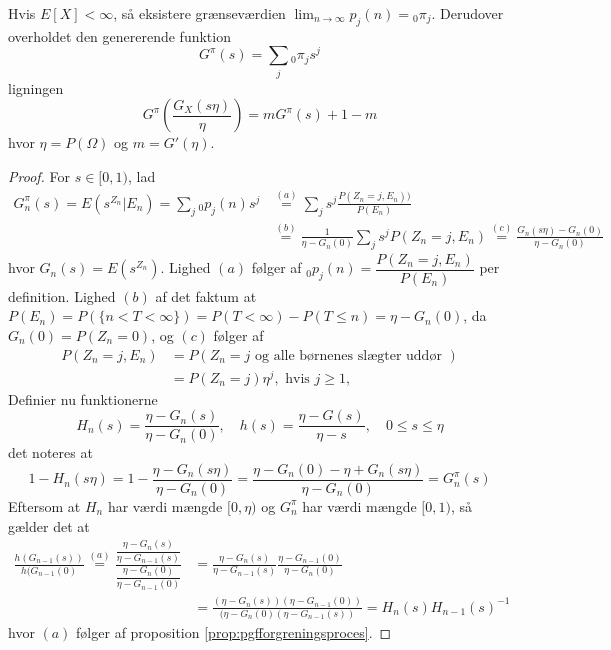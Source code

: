 \begin{lem}
Hvis $E[X] < \infty$, så eksistere grænseværdien $\lim_{n \to \infty} p_j (n) = {}_0\pi_j$. Derudover overholdet den genererende funktion
\begin{equation*}
    G^\pi(s) = \sum_j {}_0 \pi_j s^j
\end{equation*}
ligningen 
\begin{equation*}
    G^\pi\left(\frac{G_X(s\eta)}{\eta}\right) = m G^\pi(s) + 1 - m
\end{equation*}
hvor $\eta = P(\Omega)$ og $m = G'(\eta)$.
\end{lem}
\begin{proof}
For $s \in [0, 1)$, lad
\begin{align*}
    G_n^\pi (s) = E(s^{Z_n} | E_n) = \sum_j {}_0p_j(n)s^j &\stackrel{(a)}= \sum_j s^j \frac{P(Z_n = j, E_n))}{P(E_n)} \\ 
    &\stackrel{(b)} = \frac{1}{\eta - G_n(0)} \sum_j s^j P(Z_n = j, E_n) \stackrel{(c)} = \frac{G_n(s\eta) - G_n(0)}{\eta - G_n(0)}
\end{align*}
hvor $G_n(s) = E(s^{Z_n})$. Lighed $(a)$ følger af ${}_0p_j(n) = \dfrac{P(Z_n = j, E_n)}{P(E_n)}$ per definition. Lighed $(b)$ af det faktum at $P(E_n) = P(\{n < T < \infty\}) = P(T < \infty) - P(T \leq n) = \eta - G_n(0)$, da $G_n(0) = P(Z_n = 0)$, og $(c)$ følger af
\begin{align*}
    P(Z_n = j, E_n) &= P(Z_n = j \text{ og alle børnenes slægter uddør }) \\
    &= P(Z_n = j) \eta^j, \text{ hvis } j \geq 1,
\end{align*}
Definier nu funktionerne 
\begin{equation*}
    H_n(s) = \frac{\eta - G_n(s)}{\eta - G_n(0)}, \quad h(s) = \frac{\eta - G(s)}{\eta - s}, \quad 0 \leq s \leq \eta
\end{equation*}
det noteres at 
\begin{equation*} \label{eq:lemmaErAids}
    1 - H_n(s \eta) = 1 - \frac{\eta - G_n(s\eta)}{\eta - G_n(0)} = \frac{\eta - G_n(0) - \eta + G_n(s\eta)}{\eta - G_n(0)} = G_n^\pi(s)
\end{equation*}
Eftersom at $H_n$ har værdi mængde $[0, \eta)$ og $G_n^\pi$ har værdi mængde $[0, 1)$, så gælder det at 
\begin{align*}
    \frac{h(G_{n - 1}(s))}{h(G_{n - 1}(0)} \stackrel{(a)}=
    \frac{\dfrac{\eta - G_{n}(s)}{\eta - G_{n - 1}(s)}}{\dfrac{\eta - G_{n}(0)}{\eta - G_{n - 1}(0)}} &= 
    \frac{\eta - G_{n}(s)}{\eta - G_{n - 1}(s)}\frac{\eta - G_{n-1}(0)}{\eta - G_{n}(0)} \\
    &= 
    \frac{(\eta - G_{n}(s))(\eta -  G_{n - 1}(0))}{(\eta - G_n(0)(\eta - G_{n - 1}(s))}
    =
    H_n(s)H_{n - 1}(s)^{-1}
\end{align*}
hvor $(a)$ følger af proposition \ref{prop:pgfforgreningsproces}. 


\end{proof}
